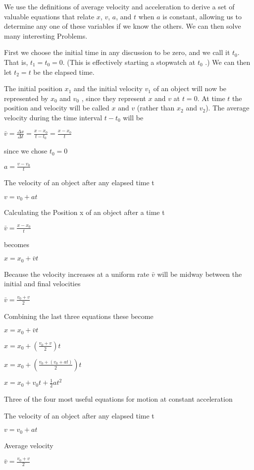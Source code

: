 \documentclass{extarticle}
\begin{document}
We use the definitions of average velocity and acceleration to derive a set of valuable equations that relate $x$, $v$, $a$, and $t$ when $a$ is constant, allowing us to determine any one of these variables if we know the others. We can then solve many interesting Problems.

First we choose the initial time in any discussion to be zero, and we call it $t_0$.
That is,  $t_1 = t_0 = 0$. (This is effectively starting a stopwatch at $t_0$ .)
We can then let $t_2 = t$ be the elapsed time.

The initial position $x_1$ and the initial velocity $v_1$  of an object will now be represented by $x_0$ and $v_0$ , since they represent $x$ and $v$ at $t = 0$.
At time $t$ the position and velocity will be called $x$ and $v$ (rather than $x_2$ and $v_2$).
The average velocity during the time interval $t - t_0$ will be

$\bar{v} = \frac{\Delta x}{\Delta t} = \frac{x - x_0}{t - t_0} = \frac{x - x_0}{t}$

since we chose $t_0 = 0$


$a = \frac{v - v_0}{t}$


The velocity of an object after any elapsed time t

$v = v_0 + at$

Calculating the 
Position x of an object after a time t

$\bar{v} = \frac{x - x_0}{t}$

becomes

$x = x_0 + \bar{v}t$


Because the velocity increases at a uniform rate $\bar{v}$ will be midway between the initial and final velocities

$\bar{v} = \frac{v_0 + v}{2}$


Combining the last three equations these become

$x = x_0 + \bar{v}t$

$x = x_0 + (\frac{v_0 + v}{2})t$

$x = x_0 + (\frac{v_0 + (v_0 + at)}{2})t$

$x = x_0 + v_0t + \frac{1}{2}at^2$



Three of the four most useful equations for motion at constant acceleration 

The velocity of an object after any elapsed time t

$v = v_0 + at$

Average velocity

$\bar{v} = \frac{v_0 + v}{2}$
\end{document}
